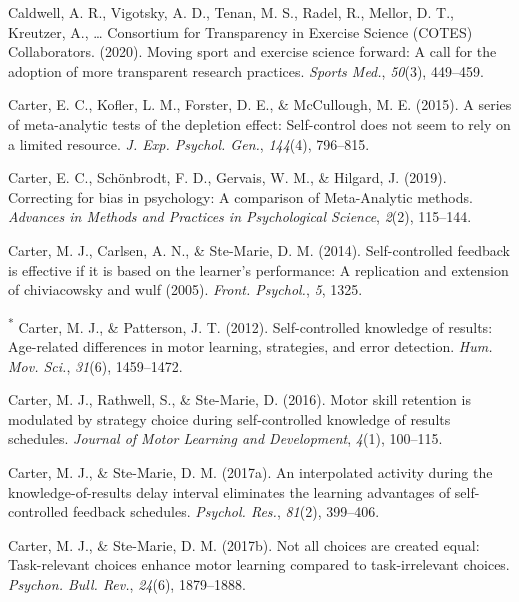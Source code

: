 \documentclass[
  english,
  man,floatsintext]{apa7}
\newlength{\cslhangindent}
\newlength{\cslentryspacingunit} %
\newenvironment{CSLReferences}[2] %
 {%
  \setlength{\parindent}{0pt}
  \ifodd #1
  \let\oldpar\par
  \def\par{\hangindent=\cslhangindent\oldpar}
  \fi
  \setlength{\parskip}{#2\cslentryspacingunit}
 }%
 {}
\begin{document}
\begin{CSLReferences}{1}{0}
\leavevmode{}%
Caldwell, A. R., Vigotsky, A. D., Tenan, M. S., Radel, R., Mellor, D. T., Kreutzer, A., \ldots{} Consortium for Transparency in Exercise Science (COTES) Collaborators. (2020). Moving sport and exercise science forward: A call for the adoption of more transparent research practices. \emph{Sports Med.}, \emph{50}(3), 449--459.

\leavevmode{}%
Carter, E. C., Kofler, L. M., Forster, D. E., \& McCullough, M. E. (2015). A series of meta-analytic tests of the depletion effect: Self-control does not seem to rely on a limited resource. \emph{J. Exp. Psychol. Gen.}, \emph{144}(4), 796--815.

\leavevmode{}%
Carter, E. C., Schönbrodt, F. D., Gervais, W. M., \& Hilgard, J. (2019). Correcting for bias in psychology: A comparison of {Meta-Analytic} methods. \emph{Advances in Methods and Practices in Psychological Science}, \emph{2}(2), 115--144.

\leavevmode{}%
Carter, M. J., Carlsen, A. N., \& Ste-Marie, D. M. (2014). Self-controlled feedback is effective if it is based on the learner's performance: A replication and extension of chiviacowsky and wulf (2005). \emph{Front. Psychol.}, \emph{5}, 1325.

\leavevmode{}%
\textsuperscript{*} Carter, M. J., \& Patterson, J. T. (2012). Self-controlled knowledge of results: Age-related differences in motor learning, strategies, and error detection. \emph{Hum. Mov. Sci.}, \emph{31}(6), 1459--1472.

\leavevmode{}%
Carter, M. J., Rathwell, S., \& Ste-Marie, D. (2016). Motor skill retention is modulated by strategy choice during self-controlled knowledge of results schedules. \emph{Journal of Motor Learning and Development}, \emph{4}(1), 100--115.

\leavevmode{}%
Carter, M. J., \& Ste-Marie, D. M. (2017a). An interpolated activity during the knowledge-of-results delay interval eliminates the learning advantages of self-controlled feedback schedules. \emph{Psychol. Res.}, \emph{81}(2), 399--406.

\leavevmode{}%
Carter, M. J., \& Ste-Marie, D. M. (2017b). Not all choices are created equal: Task-relevant choices enhance motor learning compared to task-irrelevant choices. \emph{Psychon. Bull. Rev.}, \emph{24}(6), 1879--1888.


\end{CSLReferences}
\end{document}
